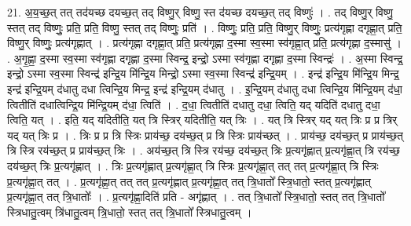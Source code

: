 \documentclass[17pt]{extarticle}
\begin{document}
21. अ॒य॒च्छ॒त् तत् तद॑यच्छ दयच्छ॒त् तद् विष्णु॒र् विष्णु॒ स्त द॑यच्छ दयच्छ॒त् तद् विष्णुः॑ । . तद् विष्णु॒र् विष्णु॒ स्तत् तद् विष्णुः॒ प्रति॒ प्रति॒ विष्णु॒ स्तत् तद् विष्णुः॒ प्रति॑ । . विष्णुः॒ प्रति॒ प्रति॒ विष्णु॒र् विष्णुः॒ प्रत्य॑गृह्णा दगृह्णा॒त् प्रति॒ विष्णु॒र् विष्णुः॒ प्रत्य॑गृह्णात् । . प्रत्य॑गृह्णा दगृह्णा॒त् प्रति॒ प्रत्य॑गृह्णा द॒स्मा स्व॒स्मा स्व॑गृह्णा॒त् प्रति॒ प्रत्य॑गृह्णा द॒स्मासु॑ । . अ॒गृ॒ह्णा॒ द॒स्मा स्व॒स्मा स्व॑गृह्णा दगृह्णा द॒स्मा स्विन्द्र॒ इन्द्रो॒ ऽस्मा स्व॑गृह्णा दगृह्णा द॒स्मा स्विन्द्रः॑ । . अ॒स्मा स्विन्द्र॒ इन्द्रो॒ ऽस्मा स्व॒स्मा स्विन्द्र॑ इन्द्रि॒य मि॑न्द्रि॒य मिन्द्रो॒ ऽस्मा स्व॒स्मा स्विन्द्र॑ इन्द्रि॒यम् । . इन्द्र॑ इन्द्रि॒य मि॑न्द्रि॒य मिन्द्र॒ इन्द्र॑ इन्द्रि॒यम् द॑धातु दधा त्विन्द्रि॒य मिन्द्र॒ इन्द्र॑ इन्द्रि॒यम् द॑धातु । . इ॒न्द्रि॒यम् द॑धातु दधा त्विन्द्रि॒य मि॑न्द्रि॒यम् द॑धा॒ त्वितीति॑ दधात्विन्द्रि॒य मि॑न्द्रि॒यम् द॑धा॒ त्विति॑ । . द॒धा॒ त्वितीति॑ दधातु दधा॒ त्विति॒ यद् यदिति॑ दधातु दधा॒ त्विति॒ यत् । . इति॒ यद् यदितीति॒ यत् त्रि स्त्रिर् यदितीति॒ यत् त्रिः । . यत् त्रि स्त्रिर् यद् यत् त्रिः प्र प्र त्रिर् यद् यत् त्रिः प्र । . त्रिः प्र प्र त्रि स्त्रिः प्राय॑च्छ॒ दय॑च्छ॒त् प्र त्रि स्त्रिः प्राय॑च्छत् । . प्राय॑च्छ॒ दय॑च्छ॒त् प्र प्राय॑च्छ॒त् त्रि स्त्रि रय॑च्छ॒त् प्र प्राय॑च्छ॒त् त्रिः । . अय॑च्छ॒त् त्रि स्त्रि रय॑च्छ॒ दय॑च्छ॒त् त्रिः प्र॒त्यगृ॑ह्णात् प्र॒त्यगृ॑ह्णा॒त् त्रि रय॑च्छ॒ दय॑च्छ॒त् त्रिः प्र॒त्यगृ॑ह्णात् । . त्रिः प्र॒त्यगृ॑ह्णात् प्र॒त्यगृ॑ह्णा॒त् त्रि स्त्रिः प्र॒त्यगृ॑ह्णा॒त् तत् तत् प्र॒त्यगृ॑ह्णा॒त् त्रि स्त्रिः प्र॒त्यगृ॑ह्णा॒त् तत् । . प्र॒त्यगृ॑ह्णा॒त् तत् तत् प्र॒त्यगृ॑ह्णात् प्र॒त्यगृ॑ह्णा॒त् तत् त्रि॒धातो᳚ स्त्रि॒धातो॒ स्तत् प्र॒त्यगृ॑ह्णात् प्र॒त्यगृ॑ह्णा॒त् तत् त्रि॒धातोः᳚ । . प्र॒त्यगृ॑ह्णा॒दिति॑ प्रति - अगृ॑ह्णात् । . तत् त्रि॒धातो᳚ स्त्रि॒धातो॒ स्तत् तत् त्रि॒धातो᳚ स्त्रिधातु॒त्वम् त्रि॑धातु॒त्वम् त्रि॒धातो॒ स्तत् तत् त्रि॒धातो᳚ स्त्रिधातु॒त्वम् । \newline
\end{document}
